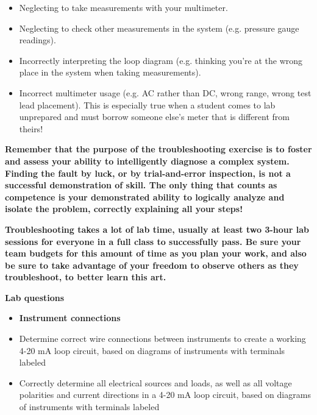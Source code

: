 \begin{itemize}
\item{} Neglecting to take measurements with your multimeter.
\item{} Neglecting to check other measurements in the system (e.g. pressure gauge readings).
\item{} Incorrectly interpreting the loop diagram (e.g. thinking you're at the wrong place in the system when taking measurements).
\item{} Incorrect multimeter usage (e.g. AC rather than DC, wrong range, wrong test lead placement).  This is especially true when a student comes to lab unprepared and must borrow someone else's meter that is different from theirs!
\end{itemize}

\vskip 10pt

{\bf Remember that the purpose of the troubleshooting exercise is to foster and assess your ability to intelligently diagnose a complex system.  Finding the fault by luck, or by trial-and-error inspection, is not a successful demonstration of skill.  The only thing that counts as competence is your demonstrated ability to logically analyze and isolate the problem, correctly explaining all your steps!}

\vskip 10pt

{\bf Troubleshooting takes a lot of lab time, usually at least two 3-hour lab sessions for everyone in a full class to successfully pass.  Be sure your team budgets for this amount of time as you plan your work, and also be sure to take advantage of your freedom to observe others as they troubleshoot, to better learn this art.}






\vfil \eject

\noindent
{\bf Lab questions}

\vskip 5pt

\begin{itemize}
\item{} {\bf Instrument connections}
\item{} Determine correct wire connections between instruments to create a working 4-20 mA loop circuit, based on diagrams of instruments with terminals labeled
\item{} Correctly determine all electrical sources and loads, as well as all voltage polarities and current directions in a 4-20 mA loop circuit, based on diagrams of instruments with terminals labeled
\end{itemize}


